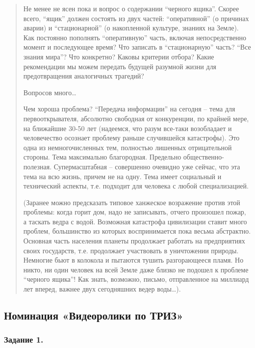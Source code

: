 \documentclass[11pt,a4paper]{article}
\begin{document}
{\begin{quote}
Не менее не ясен пока и вопрос о содержании “черного ящика”. Скорее всего,
“ящик” должен состоять из двух частей: “оперативной” (о причинах аварии) и
“стационарной” (о накопленной культуре, знаниях на Земле). Как постоянно
пополнять “оперативную” часть, включая непосредственно момент и последующее
время? Что записать в “стационарную” часть? “Все знания мира”? Что конкретно?
Каковы критерии отбора? Какие рекомендации мы можем передать будущей разумной
жизни для предотвращения аналогичных трагедий?

Вопросов много…

Чем хороша проблема? “Передача информации” на сегодня – тема для
первооткрывателя, абсолютно свободная от конкуренции, по крайней мере, на
ближайшие 30-50 лет (надеемся, что разум все-таки возобладает и человечество
осознает проблему раньше случившейся катастрофы). Это одна из немногочисленных
тем, полностью лишенных отрицательной стороны. Тема максимально
благородная. Предельно общественно-полезная. Супермасштабная – совершенно
очевидно уже сейчас, что эта тема на всю жизнь, причем не на одну. Тема имеет
социальный и технический аспекты, т.е. подходит для человека с любой
специализацией.

(Заранее можно предсказать типовое ханжеское возражение против этой проблемы:
когда горит дом, надо не записывать, отчего произошел пожар, а таскать ведра с
водой. Возможная катастрофа цивилизации ставит много проблем, большинство из
которых воспринимается пока весьма абстрактно. Основная часть населения
планеты продолжает работать на предприятиях своих государств, т.е. продолжает
участвовать в уничтожении природы. Немногие бьют в колокола и пытаются тушить
разгорающееся пламя. Но никто, ни один человек на всей Земле даже близко не
подошел к проблеме “черного ящика”! Как знать, возможно, письмо, отправленное
на миллиард лет вперед, важнее двух сегодняшних ведер воды…).
\end{quote}}

\BlackBoxOfCivilization

\subsection{Номинация «Видеоролики по ТРИЗ»}

\newcommand{\VideoThree}{Проиллюстрируйте с помощью средств кино или анимации
  решение изобретательских задач. Это могут быть как технические решения, так
  и изобретения в нетехнических областях. }

\subsubsection*{Задание 1.}\VideoOne
\end{document}

